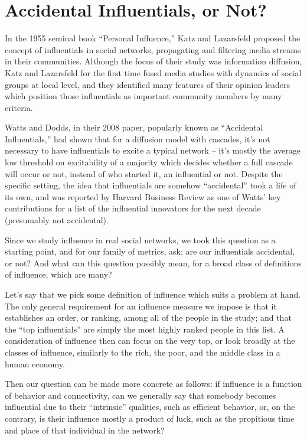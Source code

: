 \documentclass[10pt,oneside]{memoir}
\begin{document}
\section{Accidental Influentials, or Not?}
\label{accidentalinfluentialsornot}

In the 1955 seminal book ``Personal Influence,'' Katz and Lazarsfeld proposed the concept of influentials in social networks, propagating and filtering media streams in their communities.  Although the focus of their study was information diffusion, Katz and Lazarsfeld for the first time fused media studies with dynamics of social groups at local level, and they identified many features of their opinion leaders which position those influentials as important community members by many criteria.


Watts and Dodds, in their 2008 paper, popularly known as ``Accidental Influentials,'' had shown that for a diffusion model with cascades, it's not necessary to have influentials to excite a typical network -- it's mostly the average low threshold on excitability of a majority which decides whether a full cascade will occur or not, instead of who started it, an influential or not.  Despite the specific setting, the idea that influentials are somehow ``accidental'' took a life of its own, and was reported by Harvard Business Review as one of Watts' key contributions for a list of the influential innovators for the next decade (presumably not accidental).


Since we study influence in real social networks, we took this question as a starting point, and for our family of metrics, ask: are our influentials accidental, or not?  And what can this question possibly mean, for a broad class of definitions of influence, which are many?


Let's say that we pick some definition of influence which suits a problem at hand.  The only general requirement for an influence measure we impose is that it establishes an order, or ranking, among all of the people in the study; and that the ``top influentials'' are simply the most highly ranked people in this list.  A consideration of influence then can focus on the very top, or look broadly at the classes of influence, similarly to the rich, the poor, and the middle class in a human economy.


Then our question can be made more concrete as follows: if influence is a function of behavior and connectivity, can we generally say that somebody becomes influential due to their ``intrinsic'' qualities, such as efficient behavior, or, on the contrary, is their influence mostly a product of luck, such as the propitious time and place of that individual in the network?
\end{document}
